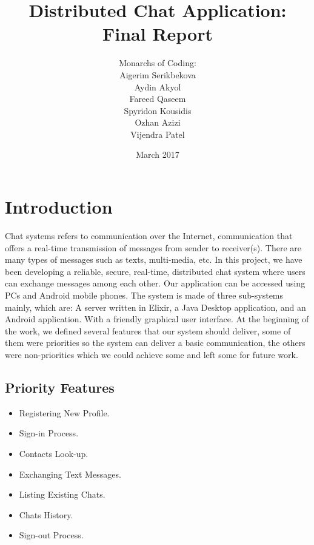 \documentclass[11pt,a4paper]{report}
\begin{document}
\title{Distributed Chat Application: Final Report}
\author{Monarchs of Coding:\\
  Aigerim Serikbekova\\
  Aydin Akyol\\
  Fareed Qaseem\\
  Spyridon Kousidis\\
  Ozhan Azizi\\
  Vijendra Patel}
\date{March 2017}
\maketitle


\chapter{Introduction}

Chat systems refers to communication over the Internet, communication that offers a real-time transmission of messages from sender to receiver(s). There are many types of messages such as texts, multi-media, etc. In this project, we have been developing a reliable, secure, real-time, distributed chat system where users can exchange messages among each other. Our application can be accessed using PCs and Android mobile phones.
The system is made of three sub-systems mainly, which are: A server written in Elixir, a Java Desktop application, and an Android application. With a friendly graphical user interface.
At the beginning of the work, we defined several features that our system should deliver, some of them were priorities so the system can deliver a basic communication, the others were non-priorities which we could achieve some and left some for future work.

\section{Priority Features}
	\begin{itemize}
		\item Registering New Profile.
		\item Sign-in Process.
		\item Contacts Look-up.
  		\item Exchanging Text Messages.
 		\item Listing Existing Chats.
		\item Chats History.
		\item Sign-out Process.
	\end{itemize}
\end{document}
